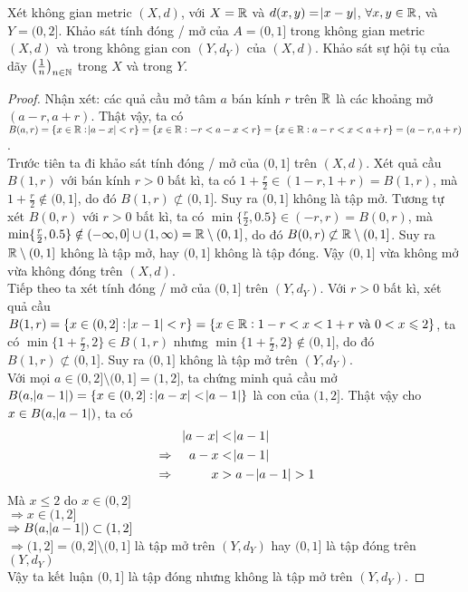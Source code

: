 \begin{exercise}{14}
    Xét không gian metric $(X,d)$, với $X=\mathbb R$ và $d(x,y)=\abs{x-y}$, $\forall x,y \in \mathbb R$, và $Y = (0,2]$. Khảo sát tính đóng / mở của $A=(0,1]$ trong không gian metric $(X,d)$ và trong không gian con $(Y,d_Y)$ của $(X,d)$. Khảo sát sự hội tụ của dãy $\left(\frac{1}{n}\right)_{n\in\mathbb N}$ trong $X$ và trong $Y$.
\end{exercise}

\begin{proof}
Nhận xét: các quả cầu mở tâm $a$ bán kính $r$ trên $\mathbb R$ là các khoảng mở $(a-r,a+r)$. Thật vậy, ta có $B(a,r) = \{x\in\mathbb R : \abs{a-x} < r \} = \{x\in\mathbb R : -r < a-x < r \} = \{x\in\mathbb R : a-r < x < a+r\} = (a-r,a+r)$.\\[3mm]

Trước tiên ta đi khảo sát tính đóng / mở của $(0,1]$ trên $(X,d)$. Xét quả cầu $B(1,r)$ với bán kính $r > 0$ bất kì, ta có $1+\frac{r}{2} \in (1-r,1+r) = B(1,r)$, mà $1 + \frac{r}{2} \notin (0,1]$, do đó $B(1,r) \not\subset (0,1]$. Suy ra $(0,1]$ không là tập mở.\nll
Tương tự xét $B(0,r)$ với $r > 0$ bất kì, ta có $\min\{\frac{r}{2}, 0.5\} \in (-r,r) = B(0,r)$, mà $\min\{\frac{r}{2}, 0.5\} \notin (-\infty,0] \cup (1,\infty) = \mathbb R \setminus (0,1]$, do đó $B(0,r) \not\subset \mathbb R \setminus (0,1]$. Suy ra $\mathbb R \setminus (0,1]$ không là tập mở, hay $(0,1]$ không là tập đóng.\nll
Vậy $(0,1]$ vừa không mở vừa không đóng trên $(X,d)$.\QEDFill\\[3mm]
Tiếp theo ta xét tính đóng / mở của $(0,1]$ trên $(Y,d_Y)$. Với $r > 0$ bất kì, xét quả cầu $B(1,r) = \{x \in (0,2] : \abs{x-1} < r\} = \{x \in \mathbb R : 1-r < x < 1+r \text{ và } 0 < x \leqslant 2\}$, ta có $\min\{1 + \frac{r}{2}, 2\} \in B(1,r)$ nhưng $\min\{1 + \frac{r}{2}, 2\} \notin (0, 1]$, do đó $B(1,r) \not\subset (0,1]$. Suy ra $(0,1]$ không là tập mở trên $(Y,d_Y)$.\\[3mm]
Với mọi $a \in (0,2] \setminus (0,1] = (1,2]$, ta chứng minh quả cầu mở $B(a,\abs{a-1}) =  \{x \in (0,2] : \abs{a-x} < \abs{a-1}\}$ là con của $(1,2]$. Thật vậy cho $x \in B(a,\abs{a-1})$, ta có
\begin{alignat*}{3}
    & & \abs{a-x} &< \abs{a-1}\\
    &\Rightarrow& a-x &< \abs{a-1}\\
    &\Rightarrow& x &> a - \abs{a-1} > 1
\end{alignat*}
Mà $x \leq 2$ do $x \in (0,2]$\\
$\Rightarrow x \in (1,2]$\\
$\Rightarrow B(a,\abs{a-1}) \subset (1,2]$\\
$\Rightarrow (1,2] = (0,2] \setminus (0,1]$ là tập mở trên $(Y,d_Y)$ hay $(0,1]$ là tập đóng trên $(Y,d_Y)$\\
Vậy ta kết luận $(0,1]$ là tập đóng nhưng không là tập mở trên $(Y,d_Y)$.
\end{proof}


